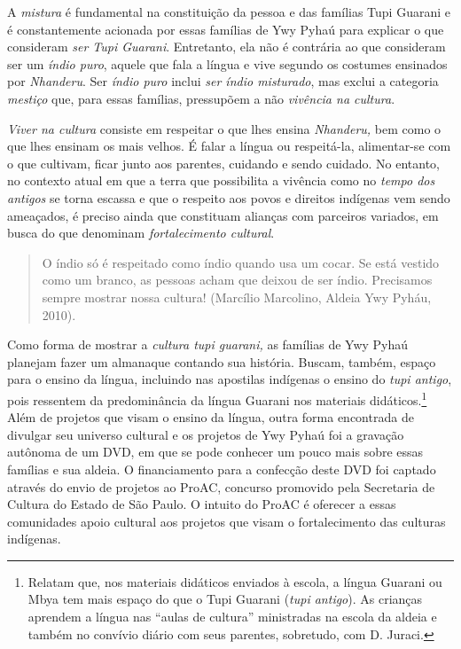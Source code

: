 A \emph{mistura} é fundamental na constituição da pessoa e das famílias
Tupi Guarani e é constantemente acionada por essas famílias de Ywy Pyhaú
para explicar o que consideram \emph{ser Tupi Guarani}. Entretanto, ela
não é contrária ao que consideram ser um \emph{índio puro}, aquele que
fala a língua e vive segundo os costumes ensinados por \emph{Nhanderu}.
Ser \emph{índio puro} inclui \emph{ser índio misturado}, mas exclui a
categoria \emph{mestiço} que, para essas famílias, pressupõem a não
\emph{vivência na cultura}.

\emph{Viver na cultura} consiste em respeitar o que lhes ensina
\emph{Nhanderu,} bem como o que lhes ensinam os mais velhos. É falar a
língua ou respeitá-la, alimentar-se com o que cultivam, ficar junto aos
parentes, cuidando e sendo cuidado. No entanto, no contexto atual em que
a terra que possibilita a vivência como no \emph{tempo dos antigos} se
torna escassa e que o respeito aos povos e direitos indígenas vem sendo
ameaçados, é preciso ainda que constituam alianças com parceiros
variados, em busca do que denominam \emph{fortalecimento cultural}.

\begin{quote}
O índio só é respeitado como índio quando usa um cocar. Se está vestido
como um branco, as pessoas acham que deixou de ser índio. Precisamos
sempre mostrar nossa cultura! (Marcílio Marcolino, Aldeia Ywy Pyháu,
2010).
\end{quote}

Como forma de mostrar a \emph{cultura tupi guarani,} as famílias de Ywy
Pyhaú planejam fazer um almanaque contando sua história. Buscam, também,
espaço para o ensino da língua, incluindo nas apostilas indígenas o
ensino do \emph{tupi antigo}, pois ressentem da predominância da língua
Guarani nos materiais didáticos.\footnote{Relatam que, nos materiais
  didáticos enviados à escola, a língua Guarani ou Mbya tem mais espaço
  do que o Tupi Guarani (\emph{tupi antigo}). As crianças aprendem a
  língua nas ``aulas de cultura'' ministradas na escola da aldeia e
  também no convívio diário com seus parentes, sobretudo, com D. Juraci.}
Além de projetos que visam o ensino da língua, outra forma encontrada de
divulgar seu universo cultural e os projetos de Ywy Pyhaú foi a gravação
autônoma de um DVD, em que se pode conhecer um pouco mais sobre essas
famílias e sua aldeia. O financiamento para a confecção deste DVD foi
captado através do envio de projetos ao ProAC, concurso promovido pela
Secretaria de Cultura do Estado de São Paulo. O intuito do ProAC é
oferecer a essas comunidades apoio cultural aos projetos que visam o
fortalecimento das culturas indígenas.

